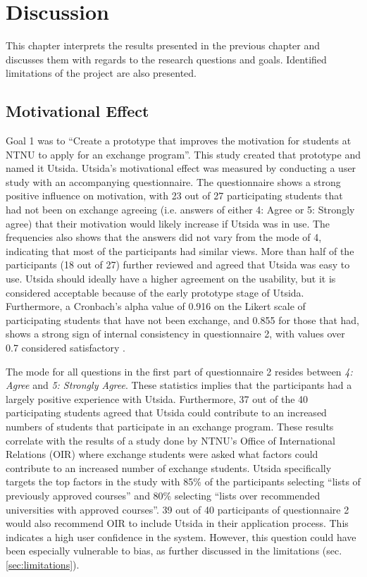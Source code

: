 \chapter{Discussion}

This chapter interprets the results presented in the previous chapter and discusses them with regards to the research questions and goals. Identified limitations of the project are also presented.

\section{Motivational Effect}

Goal 1 was to \enquote{Create a prototype that improves the motivation for students at NTNU to apply for an exchange program}. This study created that prototype and named it Utsida. Utsida's motivational effect was measured by conducting a user study with an accompanying questionnaire. The questionnaire shows a strong positive influence on motivation, with 23 out of 27 participating students that had not been on exchange agreeing (i.e. answers of either 4: Agree or 5: Strongly agree) that their motivation would likely increase if Utsida was in use. The frequencies also shows that the answers did not vary from the mode of 4, indicating that most of the participants had similar views. More than half of the participants (18 out of 27) further reviewed and agreed that Utsida was easy to use. Utsida should ideally have a higher agreement on the usability, but it is considered acceptable because of the early prototype stage of Utsida. Furthermore, a Cronbach's alpha value of 0.916 on the Likert scale of participating students that have not been exchange, and 0.855 for those that had, shows a strong sign of internal consistency in questionnaire 2, with values over 0.7 considered satisfactory \cite{bland1997statistics}.

The mode for all questions in the first part of questionnaire 2 resides between \textit{4: Agree} and \textit{5: Strongly Agree}. These statistics implies that the participants had a largely positive experience with Utsida. Furthermore, 37 out of the 40 participating students agreed that Utsida could contribute to an increased numbers of students that participate in an exchange program. These results correlate with the results of a study done by NTNU's Office of International Relations (OIR) \cite{intersek_report} where exchange students were asked what factors could contribute to an increased number of exchange students. Utsida specifically targets the top factors in the study with 85\% of the participants selecting \enquote{lists of previously approved courses} and 80\% selecting \enquote{lists over recommended universities with approved courses}. 39 out of 40 participants of questionnaire 2 would also recommend OIR to include Utsida in their application process. This indicates a high user confidence in the system. However, this question could have been especially vulnerable to bias, as further discussed in the limitations (sec. \ref{sec:limitations}).

